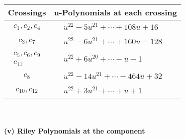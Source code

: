 \documentclass[1p]{elsarticle_modified}
\theoremstyle{definition}
\begin{document}
\begin{tabular}{m{50pt}|m{274pt}}
Crossings & \hspace{64pt}u-Polynomials at each crossing \\
\hline $$\begin{aligned}c_{1},c_{2},c_{4}\end{aligned}$$&$\begin{aligned}
&u^{22}-5 u^{21}+\cdots+108 u+16
\end{aligned}$\\
\hline $$\begin{aligned}c_{3},c_{7}\end{aligned}$$&$\begin{aligned}
&u^{22}-6 u^{21}+\cdots+160 u-128
\end{aligned}$\\
\hline $$\begin{aligned}c_{5},c_{6},c_{9}\\c_{11}\end{aligned}$$&$\begin{aligned}
&u^{22}+6 u^{20}+\cdots- u-1
\end{aligned}$\\
\hline $$\begin{aligned}c_{8}\end{aligned}$$&$\begin{aligned}
&u^{22}-14 u^{21}+\cdots-464 u+32
\end{aligned}$\\
\hline $$\begin{aligned}c_{10},c_{12}\end{aligned}$$&$\begin{aligned}
&u^{22}+3 u^{21}+\cdots+u+1
\end{aligned}$\\
\hline
\end{tabular}\\~\\
\newpage\renewcommand{\arraystretch}{1}
\flushleft \textbf{(v) Riley Polynomials at the component}\newline \\
\end{document}
